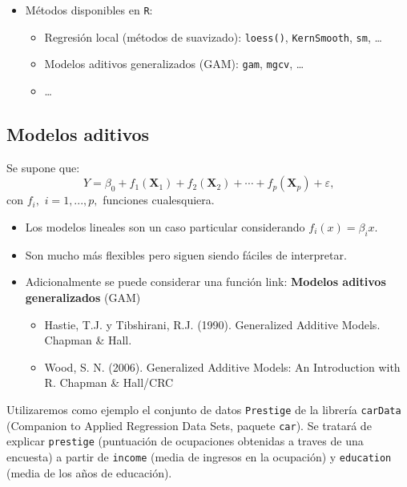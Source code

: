 \documentclass[]{book}
\begin{document}
\begin{itemize}
\item
  Métodos disponibles en \texttt{R}:

  \begin{itemize}
  \item
    Regresión local (métodos de suavizado): \texttt{loess()}, \texttt{KernSmooth}, \texttt{sm}, \ldots{}
  \item
    Modelos aditivos generalizados (GAM): \texttt{gam}, \texttt{mgcv}, \ldots{}
  \item
    \ldots{}
  \end{itemize}
\end{itemize}

\hypertarget{modelos-aditivos}{%
\subsection{Modelos aditivos}\label{modelos-aditivos}}

Se supone que:
\[Y=\beta_{0}+f_{1}\left(  \mathbf{X}_{1}\right)  +f_{2}\left(  \mathbf{X}_{2}\right)  +\cdots+f_{p}\left(  \mathbf{X}_{p}\right)  +\varepsilon\text{,}\]
con \(f_{i},\) \(i=1,...,p,\) funciones cualesquiera.

\begin{itemize}
\item
  Los modelos lineales son un caso particular considerando \(f_{i}(x) = \beta_{i}x\).
\item
  Son mucho más flexibles pero siguen siendo fáciles de interpretar.
\item
  Adicionalmente se puede considerar una función link:
  \textbf{Modelos aditivos generalizados} (GAM)

  \begin{itemize}
  \item
    Hastie, T.J. y Tibshirani, R.J. (1990). Generalized Additive Models.
    Chapman \& Hall.
  \item
    Wood, S. N. (2006). Generalized Additive Models: An Introduction with R.
    Chapman \& Hall/CRC
  \end{itemize}
\end{itemize}

Utilizaremos como ejemplo el conjunto de datos \texttt{Prestige} de la librería \texttt{carData}
(Companion to Applied Regression Data Sets, paquete \texttt{car}).
Se tratará de explicar \texttt{prestige} (puntuación de ocupaciones obtenidas a traves
de una encuesta) a partir de \texttt{income} (media de ingresos en la ocupación) y
\texttt{education} (media de los años de educación).
\end{document}
